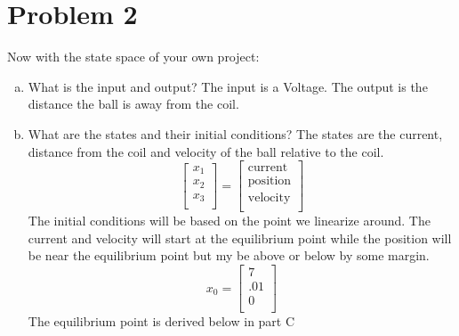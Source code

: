 \documentclass{article}
\begin{document}
\section*{Problem 2}
Now with the state space of your own project:
\begin{enumerate}[a.]
\item What is the input and output?
\newline
The input is a Voltage.
The output is the distance the ball is away from the coil.

\item What are the states and their initial conditions?
\newline
The states are the current, distance from the coil and velocity of the ball relative to the coil.
$$
\begin{bmatrix}
x_1 \\
x_2 \\
x_3 \\
\end{bmatrix}
=
\begin{bmatrix}
\text{current} \\
\text{position} \\
\text{velocity} \\
\end{bmatrix}
$$
The initial conditions will be based on the point we linearize around.
The current and velocity will start at the equilibrium point while the position will be near the equilibrium point but my be above or below by some margin.
$$
x_0
=
\begin{bmatrix}
7   \\
.01 \\
0   \\
\end{bmatrix}
$$
The equilibrium point is derived below in part C


\end{enumerate}
\end{document}
